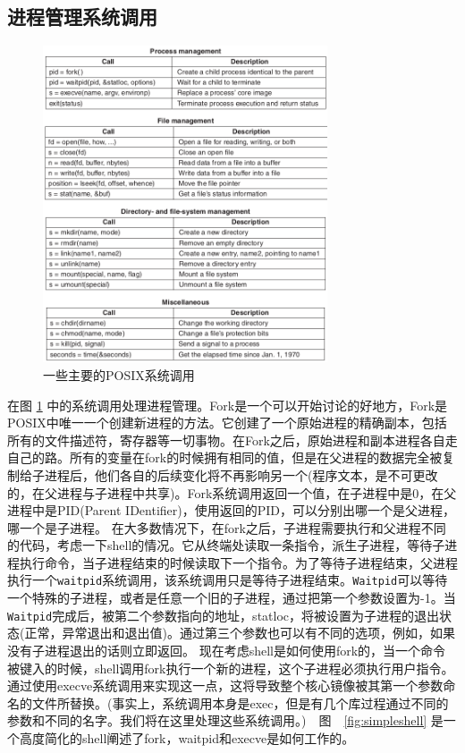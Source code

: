 	\subsection{进程管理系统调用}
	
	\begin{figure}[ht]\small
		\centering
		\includegraphics[width=0.75\textwidth]{FIG/1-18.png}
		\caption{一些主要的POSIX系统调用}\label{fig:systemcalls}
	\end{figure}
	
	在图 \ref{fig:systemcalls} 中的系统调用处理进程管理。Fork是一个可以开始讨论的好地方，Fork是POSIX中唯一一个创建新进程的方法。它创建了一个原始进程的精确副本，包括所有的文件描述符，寄存器等一切事物。在Fork之后，原始进程和副本进程各自走自己的路。所有的变量在fork的时候拥有相同的值，但是在父进程的数据完全被复制给子进程后，他们各自的后续变化将不再影响另一个(程序文本，是不可更改的，在父进程与子进程中共享)。Fork系统调用返回一个值，在子进程中是0，在父进程中是PID(Parent IDentifier)，使用返回的PID，可以分别出哪一个是父进程，哪一个是子进程。
	在大多数情况下，在fork之后，子进程需要执行和父进程不同的代码，考虑一下shell的情况。它从终端处读取一条指令，派生子进程，等待子进程执行命令，当子进程结束的时候读取下一个指令。为了等待子进程结束，父进程执行一个\texttt{waitpid}系统调用，该系统调用只是等待子进程结束。\texttt{Waitpid}可以等待一个特殊的子进程，或者是任意一个旧的子进程，通过把第一个参数设置为-1。当\texttt{Waitpid}完成后，被第二个参数指向的地址，statloc，将被设置为子进程的退出状态(正常，异常退出和退出值)。通过第三个参数也可以有不同的选项，例如，如果没有子进程退出的话则立即返回。
	现在考虑shell是如何使用fork的，当一个命令被键入的时候，shell调用fork执行一个新的进程，这个子进程必须执行用户指令。通过使用execve系统调用来实现这一点，这将导致整个核心镜像被其第一个参数命名的文件所替换。(事实上，系统调用本身是exec，但是有几个库过程通过不同的参数和不同的名字。我们将在这里处理这些系统调用。)　图　\ref{fig:simpleshell} 是一个高度简化的shell阐述了fork，waitpid和execve是如何工作的。
	
